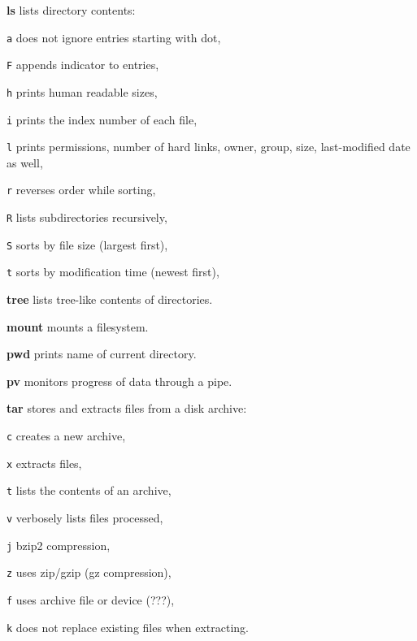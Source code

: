 \begin{compactenum}
	\item [\cmdcore] \textbf{ls} lists directory contents:
	\item [\texttt{a}] does not ignore entries starting with dot, 
	\item [\texttt{F}] appends indicator to entries, 
	\item [\texttt{h}] prints human readable sizes, 
	\item [\texttt{i}] prints the index number of each file, 
	\item [\texttt{l}] prints permissions, number of hard links, owner, group, size, last-modified date as well, 
	\item [\texttt{r}] reverses order while sorting,
	\item [\texttt{R}] lists subdirectories recursively, 
	\item [\texttt{S}] sorts by file size (largest first), 
	\item [\texttt{t}] sorts by modification time (newest first), 
	\item [\cmdvar] \textbf{tree} lists tree-like contents of directories.
\end{compactenum}

\begin{compactenum}
	\item [\cmdvar] \textbf{mount} mounts a filesystem.
\end{compactenum}

\begin{compactenum}
	\item [\cmdcore] \textbf{pwd} prints name of current directory.
\end{compactenum}

\begin{compactenum}
	\item [\cmdcore] \textbf{pv} monitors progress of data through a pipe.
\end{compactenum}

\begin{compactenum}
	\item [\cmdvar] \textbf{tar} stores and extracts files from a disk archive:
	\item [\texttt{c}] creates a new archive,
	\item [\texttt{x}] extracts files,
	\item [\texttt{t}] lists the contents of an archive,
	\item [\texttt{v}] verbosely lists files processed,
	\item [\texttt{j}] bzip2 compression,
	\item [\texttt{z}] uses zip/gzip (gz compression),
	\item [\texttt{f}] uses archive file or device (???),
	\item [\texttt{k}] does not replace existing files when extracting.
\end{compactenum}

